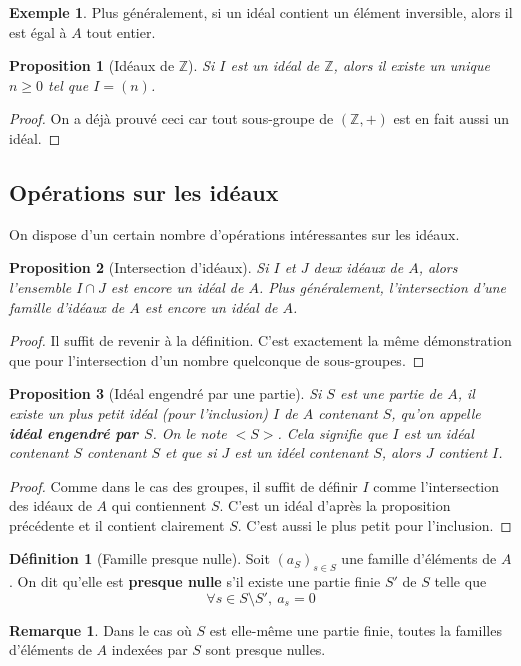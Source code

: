 \documentclass[french]{book}
\newcommand{\Z}{\mathbb{Z}}
\theoremstyle{plain}
\newtheorem{prop}{Proposition}[chapter]
\theoremstyle{definition}
\newtheorem{dfn}{Définition}[chapter]
\newtheorem{exa}{Exemple}[chapter]
\newtheorem{rmq}{Remarque}[chapter]
\theoremstyle{remark}
\begin{document}
\begin{exa}
	Plus généralement, si un idéal contient un élément inversible, alors il est égal à $A$ tout entier.
\end{exa}
\begin{prop}[Idéaux de $\Z$]
	Si $I$ est un idéal de $\Z$, alors il existe un unique $n\geqslant0$ tel que $I=(n)$.
\end{prop}
\begin{proof}
	On a déjà prouvé ceci car tout sous-groupe de $(\Z,+)$ est en fait aussi un idéal.
\end{proof}
\subsection{Opérations sur les idéaux}
On dispose d'un certain nombre d'opérations intéressantes sur les idéaux.
\begin{prop}[Intersection d'idéaux]
	Si $I$ et $J$ deux idéaux de $A$, alors l'ensemble $I\cap J$ est encore un idéal de $A$. Plus généralement, l'intersection d'une famille d'idéaux de $A$ est encore un idéal de $A$.
\end{prop}
\begin{proof}
	Il suffit de revenir à la définition. C'est exactement la même démonstration que pour l'intersection d'un nombre quelconque de sous-groupes.
\end{proof}
\begin{prop}[Idéal engendré par une partie]
	Si $S$ est une partie de $A$, il existe un plus petit idéal (pour l'inclusion) $I$ de $A$ contenant $S$, qu'on appelle \textbf{idéal engendré par $S$}. On le note $<S>$. Cela signifie que $I$ est un idéal contenant $S$ contenant $S$ et que si $J$ est un idéel contenant $S$, alors $J$ contient $I$. 
\end{prop}
\begin{proof}
	Comme dans le cas des groupes, il suffit de définir $I$ comme l'intersection des idéaux de $A$ qui contiennent $S$. C'est un idéal d'après la proposition précédente et il contient clairement $S$. C'est aussi le plus petit pour l'inclusion.
\end{proof}
\begin{dfn}[Famille presque nulle]
	Soit $(a_S)_{s\in S}$ une famille d'éléments de $A$. On dit qu'elle est \textbf{presque nulle} s'il existe une partie finie $S'$ de $S$ telle que $$\forall s\in S\setminus S',\ a_s=0$$
\end{dfn}
\begin{rmq}
	Dans le cas où $S$ est elle-même une partie finie, toutes la familles d'éléments de $A$ indexées par $S$ sont presque nulles.
\end{rmq}
\end{document}
